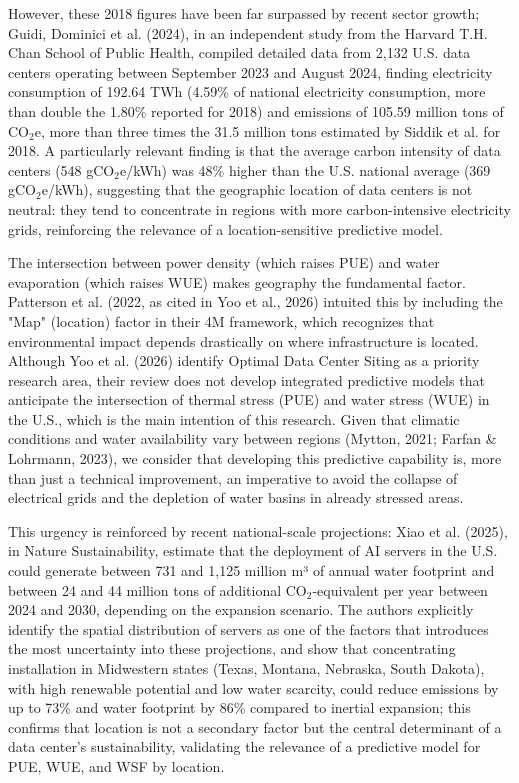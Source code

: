\documentclass[conference]{IEEEtran}
\begin{document}
However, these 2018 figures have been far surpassed by recent sector growth; Guidi, Dominici et al. (2024), in an independent study from the Harvard T.H. Chan School of Public Health, compiled detailed data from 2,132 U.S. data centers operating between September 2023 and August 2024, finding electricity consumption of 192.64 TWh (4.59\% of national electricity consumption, more than double the 1.80\% reported for 2018) and emissions of 105.59 million tons of CO$_2$e, more than three times the 31.5 million tons estimated by Siddik et al. for 2018. A particularly relevant finding is that the average carbon intensity of data centers (548 gCO$_2$e/kWh) was 48\% higher than the U.S. national average (369 gCO$_2$e/kWh), suggesting that the geographic location of data centers is not neutral: they tend to concentrate in regions with more carbon-intensive electricity grids, reinforcing the relevance of a location-sensitive predictive model.

The intersection between power density (which raises PUE) and water evaporation (which raises WUE) makes geography the fundamental factor. Patterson et al. (2022, as cited in Yoo et al., 2026) intuited this by including the "Map" (location) factor in their 4M framework, which recognizes that environmental impact depends drastically on where infrastructure is located. Although Yoo et al. (2026) identify Optimal Data Center Siting as a priority research area, their review does not develop integrated predictive models that anticipate the intersection of thermal stress (PUE) and water stress (WUE) in the U.S., which is the main intention of this research. Given that climatic conditions and water availability vary between regions (Mytton, 2021; Farfan \& Lohrmann, 2023), we consider that developing this predictive capability is, more than just a technical improvement, an imperative to avoid the collapse of electrical grids and the depletion of water basins in already stressed areas.

This urgency is reinforced by recent national-scale projections: Xiao et al. (2025), in Nature Sustainability, estimate that the deployment of AI servers in the U.S. could generate between 731 and 1,125 million m³ of annual water footprint and between 24 and 44 million tons of additional CO$_2$-equivalent per year between 2024 and 2030, depending on the expansion scenario. The authors explicitly identify the spatial distribution of servers as one of the factors that introduces the most uncertainty into these projections, and show that concentrating installation in Midwestern states (Texas, Montana, Nebraska, South Dakota), with high renewable potential and low water scarcity, could reduce emissions by up to 73\% and water footprint by 86\% compared to inertial expansion; this confirms that location is not a secondary factor but the central determinant of a data center's sustainability, validating the relevance of a predictive model for PUE, WUE, and WSF by location.
\end{document}
